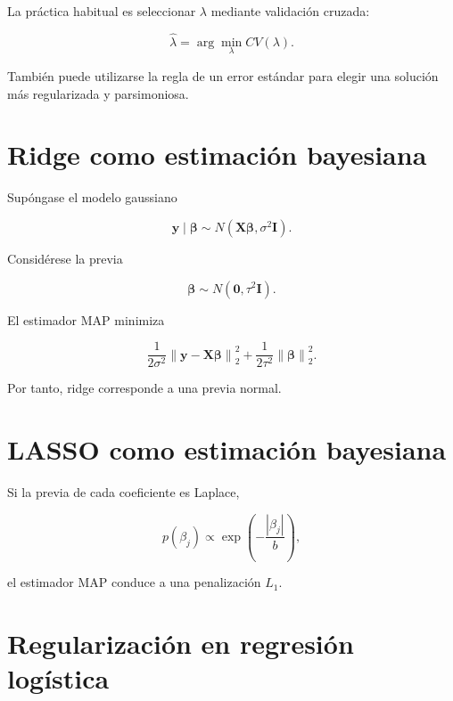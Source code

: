 \documentclass[
  spanish,
  10.5pt,
  letterpaper,
  DIV=11,
  numbers=noendperiod,
  oneside,
  open=any]{scrreprt}
\theoremstyle{definition}
\theoremstyle{definition}
\theoremstyle{plain}
\theoremstyle{remark}
\begin{document}

La práctica habitual es seleccionar \(\lambda\) mediante validación
cruzada:

\[
\widehat{\lambda}
=
\arg\min_{\lambda}
CV(\lambda).
\]

También puede utilizarse la regla de un error estándar para elegir una
solución más regularizada y parsimoniosa.

\section*{Ridge como estimación
bayesiana}\label{ridge-como-estimaciuxf3n-bayesiana}


Supóngase el modelo gaussiano

\[
\mathbf{y}
\mid
\boldsymbol{\beta}
\sim
N(
\mathbf{X}\boldsymbol{\beta},
\sigma^2\mathbf{I}
).
\]

Considérese la previa

\[
\boldsymbol{\beta}
\sim
N(
\mathbf{0},
\tau^2\mathbf{I}
).
\]

El estimador MAP minimiza

\[
\frac{1}{2\sigma^2}
\left\|
\mathbf{y}
-
\mathbf{X}\boldsymbol{\beta}
\right\|_2^2
+
\frac{1}{2\tau^2}
\left\|
\boldsymbol{\beta}
\right\|_2^2.
\]

Por tanto, ridge corresponde a una previa normal.

\section*{LASSO como estimación
bayesiana}\label{lasso-como-estimaciuxf3n-bayesiana}


Si la previa de cada coeficiente es Laplace,

\[
p(\beta_j)
\propto
\exp
\left(
-\frac{|\beta_j|}{b}
\right),
\]

el estimador MAP conduce a una penalización \(L_1\).

\section*{Regularización en regresión
logística}\label{regularizaciuxf3n-en-regresiuxf3n-loguxedstica}
\end{document}
